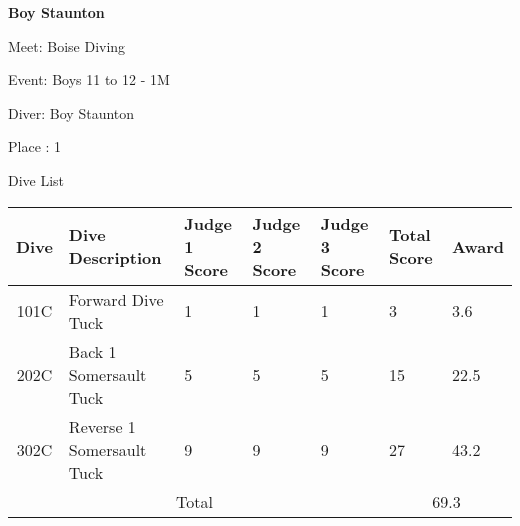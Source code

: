 \documentclass[12pt, letterpaper, landscape]{article}
\begin{document}
	\begin{center}
		\textbf{Boy Staunton}
	\end{center}
	
	Meet: Boise Diving

	Event: Boys 11 to 12 - 1M
	
	Diver: Boy Staunton
	
	Place : 1
	
	\begin{center}
		Dive List
	\end{center}
	
	\begin{table}[h]
		\centering
			\begin{tabularx}{\textwidth}{|c X X X X X X|}
			Dive&Dive Description&Judge 1 Score&Judge 2 Score&Judge 3 Score&Total Score & Award\\\midrule
			101C&Forward Dive Tuck&1&1&1&3&3.6\\\midrule
202C&Back 1 Somersault Tuck&5&5&5&15&22.5\\\midrule
302C&Reverse 1 Somersault Tuck&9&9&9&27&43.2\\\midrule
\midrule
			\multicolumn{5}{|c}{Total} & \multicolumn{2}{c|}{69.3}\\
		\end{tabularx}
	\end{table}
\end{document}
